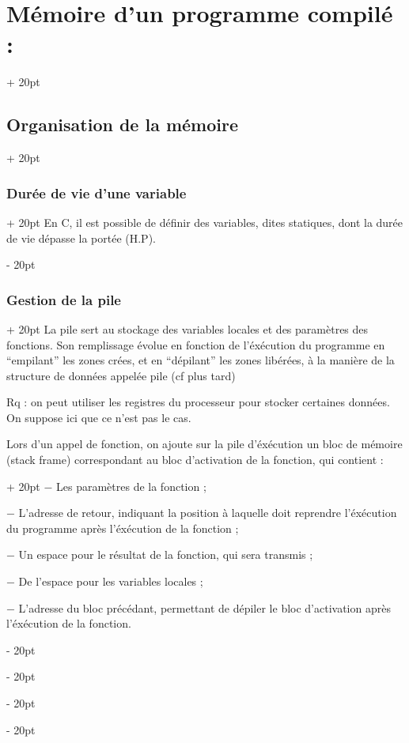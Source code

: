 \documentclass[a4paper, 12pt, twoside]{article}
\newcommand{\ind}[1][20pt]{\advance\leftskip + #1}
\newcommand{\deind}[1][20pt]{\advance\leftskip - #1}
\newenvironment{indentedenv}[1][20pt]{\par \ind[#1]}{\par \deind}
\newenvironment{indt}[2][20pt]{#2 \begin{indentedenv}[#1]}{\end{indentedenv}} %
\begin{document}
\begin{indt}{\section{Mémoire d'un programme compilé :}}
\begin{indt}{\subsection{Organisation de la mémoire}}
\begin{indt}{\subsubsection{Durée de vie d'une variable}}
                En C, il est possible de définir des variables, dites statiques, dont la durée de vie dépasse la portée (H.P).
            \end{indt}
            
            \vspace{6pt}
            
            \begin{indt}{\subsubsection{Gestion de la pile}}
                La pile sert au stockage des variables locales et des paramètres des fonctions. Son remplissage évolue en fonction de l'éxécution du programme en ``empilant'' les zones crées, et en ``dépilant'' les zones libérées, à la manière de la structure de données appelée pile (cf plus tard)
                
                \vspace{6pt}
                
                Rq : on peut utiliser les registres du processeur pour stocker certaines données. On suppose ici que ce n'est pas le cas.
                
                \vspace{6pt}
                
                \begin{indt}{Lors d'un appel de fonction, on ajoute sur la pile d'éxécution un bloc de mémoire (stack frame) correspondant au bloc d'activation de la fonction, qui contient :}
                    $-$ Les paramètres de la fonction ;
                    
                    $-$ L'adresse de retour, indiquant la position à laquelle doit reprendre l'éxécution du programme après l'éxécution de la fonction ;
                    
                    $-$ Un espace pour le résultat de la fonction, qui sera transmis ;
                    
                    $-$ De l'espace pour les variables locales ;
                    
                    $-$ L'adresse du bloc précédant, permettant de dépiler le bloc d'activation après l'éxécution de la fonction.
                \end{indt}
                
                \vspace{6pt}
                

\end{indt}
\end{indt}
\end{indt}
\end{document}

